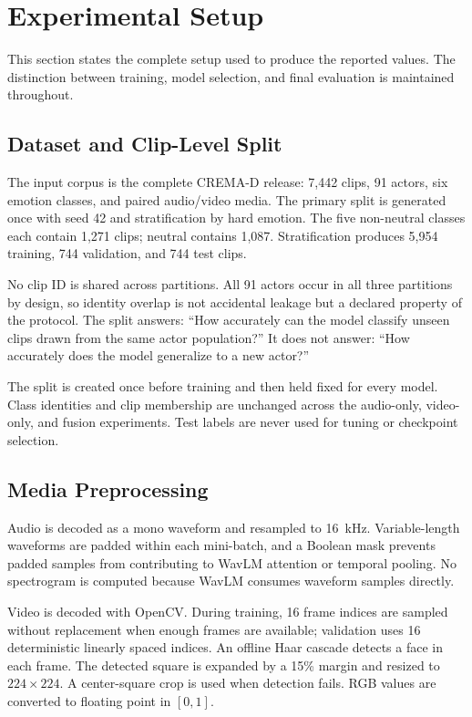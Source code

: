 \documentclass[conference]{IEEEtran}
\begin{document}
\section{Experimental Setup}
\label{sec:setup}

This section states the complete setup used to produce the reported values.
The distinction between training, model selection, and final evaluation is
maintained throughout.

\subsection{Dataset and Clip-Level Split}

The input corpus is the complete CREMA-D release: 7,442 clips, 91 actors, six
emotion classes, and paired audio/video media. The primary split is generated
once with seed 42 and stratification by hard emotion. The five non-neutral
classes each contain 1,271 clips; neutral contains 1,087. Stratification
produces 5,954 training, 744 validation, and 744 test clips.

No clip ID is shared across partitions. All 91 actors occur in all three
partitions by design, so identity overlap is not accidental leakage but a
declared property of the protocol. The split answers: ``How accurately can the
model classify unseen clips drawn from the same actor population?'' It does
not answer: ``How accurately does the model generalize to a new actor?''

The split is created once before training and then held fixed for every model.
Class identities and clip membership are unchanged across the audio-only,
video-only, and fusion experiments. Test labels are never used for tuning or
checkpoint selection.

\subsection{Media Preprocessing}

Audio is decoded as a mono waveform and resampled to 16~kHz. Variable-length
waveforms are padded within each mini-batch, and a Boolean mask prevents padded
samples from contributing to WavLM attention or temporal pooling. No
spectrogram is computed because WavLM consumes waveform samples directly.

Video is decoded with OpenCV. During training, 16 frame indices are sampled
without replacement when enough frames are available; validation uses 16
deterministic linearly spaced indices. An offline Haar cascade detects a face
in each frame. The detected square is expanded by a 15\% margin and resized to
$224\times224$. A center-square crop is used when detection fails. RGB values
are converted to floating point in $[0,1]$.
\end{document}
